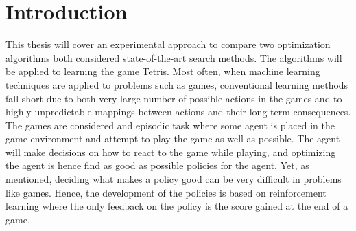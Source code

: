\section{Introduction \label{sec:intro}}

This thesis will cover an experimental approach 
to compare two optimization algorithms both considered 
state-of-the-art search methods. The algorithms will be applied to 
learning the game Tetris. Most often, when machine learning
techniques are applied to problems such as games, conventional
learning methods fall short due to both  very large number of 
possible actions in the games and to highly unpredictable mappings 
between actions and their long-term consequences. The games 
are considered and episodic task where some agent is placed
in the game environment and attempt to play the game as well
as possible. The agent will make decisions on how to react 
to the game while playing, and optimizing the agent is hence 
find as good as possible policies for the agent. Yet, as mentioned,
deciding what makes a policy good can be very difficult in
problems like games. Hence, the development of the policies 
is based on reinforcement learning where the only feedback 
on the policy is the score gained at the end of a game.










